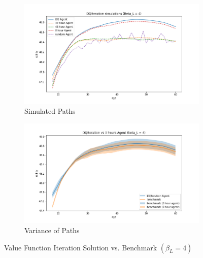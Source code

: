 \begin{figure}[ht]
\begin{subfigure}{.5\textwidth}
  \centering
  \includegraphics[width=1\linewidth]{figures/dqi_model1_beta_4_solution_benchmark_paths.png}
  \caption{Simulated Paths}
  \label{fig:dqi_solution_beta4_path}
\end{subfigure}%
\begin{subfigure}{.5\textwidth}
  \centering
  \includegraphics[width=1\linewidth]{figures/dqi_model1_beta_4_solution_benchmark_variance.png}
  \caption{Variance of Paths}
  \label{fig:dqi_solution_beta4_var}
\end{subfigure}
    \caption{Value Function Iteration Solution vs. Benchmark $(\beta_L = 4)$}
    \label{fig:dqi_solution_beta4}
\end{figure}

